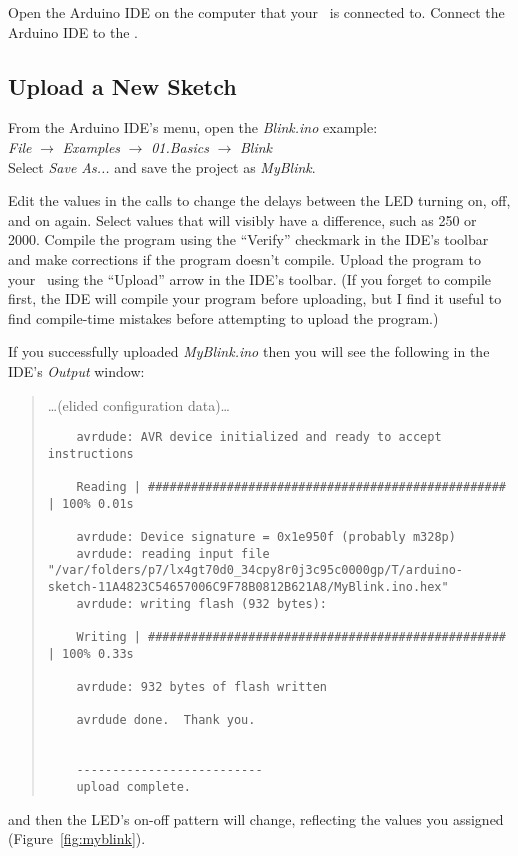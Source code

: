    Open the Arduino IDE on the computer that your \developmentboard\ is connected to.
    Connect the Arduino IDE to the \developmentboard.
    

\subsection{Upload a New Sketch}

    From the Arduino IDE's menu, open the \textit{Blink.ino} example: \\
    \textit{File} $\rightarrow$ \textit{Examples} $\rightarrow$ \textit{01.Basics} $\rightarrow$ \textit{Blink} \\
    Select \textit{Save As...} and save the project as \textit{MyBlink}.

    Edit the values in the  calls to change the delays between the LED turning on, off, and on again.
    Select values that will visibly have a difference, such as 250 or 2000.
    Compile the program using the ``Verify'' checkmark in the IDE's toolbar and make corrections if the program doesn't compile.
    Upload the program to your \developmentboard\ using the ``Upload'' arrow in the IDE's toolbar.
    (If you forget to compile first, the IDE will compile your program before uploading, but I find it useful to find compile-time mistakes before attempting to upload the program.)

    If you successfully uploaded \textit{MyBlink.ino} then you will see the following in the IDE's \textit{Output} window:
    \begin{quote}
    \dots (elided configuration data)\dots
    \begin{verbatim}
    avrdude: AVR device initialized and ready to accept instructions

    Reading | ################################################## | 100% 0.01s

    avrdude: Device signature = 0x1e950f (probably m328p)
    avrdude: reading input file "/var/folders/p7/lx4gt70d0_34cpy8r0j3c95c0000gp/T/arduino-sketch-11A4823C54657006C9F78B0812B621A8/MyBlink.ino.hex"
    avrdude: writing flash (932 bytes):

    Writing | ################################################## | 100% 0.33s

    avrdude: 932 bytes of flash written

    avrdude done.  Thank you.


    --------------------------
    upload complete.
    \end{verbatim}\end{quote}
    and then the LED's on-off pattern will change, reflecting the  values you assigned (Figure~\ref{fig:myblink}).

